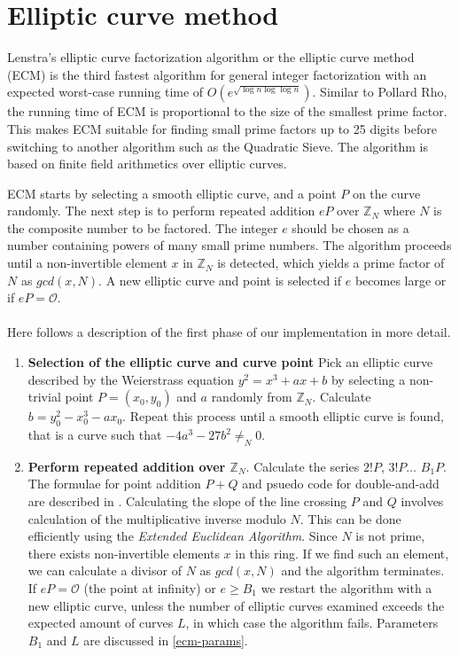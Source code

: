 \documentclass{article}
\begin{document}
\newpage



\section{Elliptic curve method}
\label{ecm}
Lenstra's elliptic curve factorization algorithm or the elliptic curve method (ECM) is the third fastest algorithm for general integer factorization with an expected worst-case running time of $O(e^{\sqrt{\log n \log\log n}})$\cite{Lenstra87}. Similar to Pollard Rho, the running time of ECM is proportional to the size of the smallest prime factor. This makes ECM suitable for finding small prime factors up to 25 digits before switching to another algorithm such as the Quadratic Sieve. The algorithm is based on finite field arithmetics over elliptic curves.

ECM starts by selecting a smooth elliptic curve, and a point $P$ on the curve randomly. The next step is to perform repeated addition $eP$ over $\mathbb{Z}_N$ where $N$ is the composite number to be factored. The integer $e$ should be chosen as a number containing powers of many small prime numbers. The algorithm proceeds until a non-invertible element $x$ in $\mathbb{Z}_N$ is detected, which yields a prime factor of $N$ as $gcd(x, N)$. A new elliptic curve and point is selected if $e$ becomes large or if $eP=\mathcal{O}$.
\\\\
Here follows a description of the first phase of our implementation in more detail.
\begin{enumerate}
\item \textbf{Selection of the elliptic curve and curve point} Pick an elliptic curve described by the Weierstrass equation $y^2 = x^3 + ax + b$ by selecting a non-trivial point $P=(x_0, y_0)$ and $a$ randomly from $\mathbb{Z}_N$. Calculate $b = y_0^2-x_0^3-ax_0$. Repeat this process until a smooth elliptic curve is found, that is a curve such that $-4a^3-27b^2\ne_N 0$\cite{Silverman93}.

\item \textbf{Perform repeated addition over $\mathbb{Z}_N$}. Calculate the series $2!P$, $3!P\ldots$ $B_1P$. The formulae for point addition $P+Q$ and psuedo code for double-and-add are described in \cite{Fredriksson15}. Calculating the slope of the line crossing $P$ and $Q$ involves calculation of the multiplicative inverse modulo $N$. This can be done efficiently using the \textit{Extended Euclidean Algorithm}. Since $N$ is not prime, there exists non-invertible elements $x$ in this ring. If we find such an element, we can calculate a divisor of $N$ as $gcd(x, N)$ and the algorithm terminates. If $eP = \mathcal{O}$ (the point at infinity) or $e \ge B_1$ we restart the algorithm with a new elliptic curve, unless the number of elliptic curves examined exceeds the expected amount of curves $L$, in which case the algorithm fails. Parameters $B_1$ and $L$ are discussed in \ref{ecm-params}.
\end{enumerate}
\end{document}
